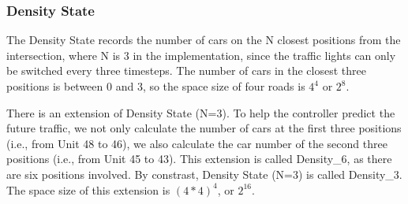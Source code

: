 \subsubsection{Density State}
The Density State records the number of cars on the N closest positions from the
intersection, where N is 3 in the implementation, since the traffic lights can
only be switched every three timesteps. The number of cars in the closest three
positions is between 0 and 3, so the space size of four roads is $4^4$ or $2^8$.

There is an extension of Density State (N=3). To help the controller predict the
future traffic, we not only calculate the number of cars at the first three
positions (i.e., from Unit 48 to 46), we also calculate the car number of the
second three positions (i.e., from Unit 45 to 43). This extension is called
Density\_6, as there are six positions involved. By constrast, Density State
(N=3) is called Density\_3. The space size of this extension is $(4 * 4) ^{4}$,
or $2^{16}$.